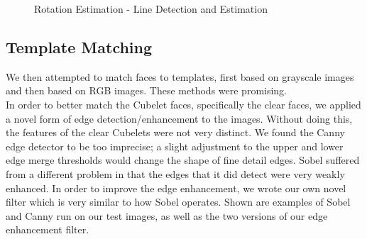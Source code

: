 \documentclass[conference]{IEEEtran}
\begin{document}
\begin{figure}[!h]
\centerline{
\label{fig_first_case}
\hfil
{}}
\caption{Rotation Estimation - Line Detection and Estimation}
\label{fig_sim}
\end{figure} 

\subsection{Template Matching}

We then attempted to match faces to templates, first based on grayscale images and then based on RGB images. These methods were promising.\\

In order to better match the Cubelet faces, specifically the clear faces, we applied a novel form of edge detection/enhancement to the images. Without doing this, the features of the clear Cubelets were not very distinct.  We found the Canny edge detector to be too imprecise; a slight adjustment to the upper and lower edge merge thresholds would change the shape of fine detail edges. Sobel suffered from a different problem in that the edges that it did detect were very weakly enhanced.  In order to improve the edge enhancement, we  wrote our own novel filter which is very similar to how Sobel operates.  Shown are examples of Sobel and Canny run on our test images, as well as the two versions of our edge enhancement filter.  \\
\end{document}
